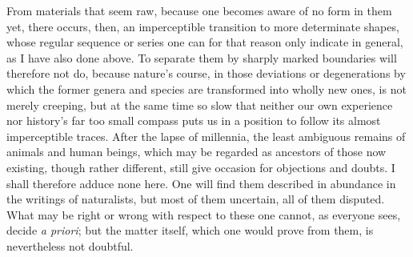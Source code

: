 \documentclass[12pt,a4paper,openany]{book}
\newcommand{\opage}[1]{\marginnote{\footnotesize\textit{[#1]}}}
\begin{document}
From materials that seem raw, because one becomes aware of no form in them yet,
there occurs, then, an imperceptible transition to more determinate shapes, whose
regular sequence or
\setcounter{footnote}{0}%
\opage{112}series one can for that reason only indicate in general, as I have also done
above. To separate them by sharply marked boundaries will therefore not do, because
nature's course, in those deviations or degenerations by which the former genera and
species are transformed into wholly new ones, is not merely creeping, but at the
same time so slow that neither our own experience nor history's far too small
compass puts us in a position to follow its almost imperceptible traces. After the
lapse of millennia, the least ambiguous remains of animals and human beings, which
may be regarded as ancestors of those now existing, though rather different, still
give occasion for objections and doubts. I shall therefore adduce none here. One
will find them described in abundance in the writings of naturalists, but most of
them uncertain, all of them disputed. What may be right or wrong with respect to
these one cannot, as everyone sees, decide \textit{a priori}; but the matter itself,
which one would prove from them, is nevertheless not doubtful.
\end{document}
